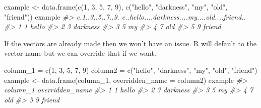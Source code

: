 \documentclass[
]{krantz}
\makeatletter
\newenvironment{Shaded}{\begin{snugshade}}{\end{snugshade}}
\newcommand{\AttributeTok}[1]{\textcolor[rgb]{0.61,0.61,0.61}{#1}}
\newcommand{\CommentTok}[1]{\textcolor[rgb]{0.37,0.37,0.37}{\textit{#1}}}
\newcommand{\DecValTok}[1]{\textcolor[rgb]{0.06,0.06,0.06}{#1}}
\newcommand{\FunctionTok}[1]{\textcolor[rgb]{0,0,0}{#1}}
\newcommand{\NormalTok}[1]{#1}
\newcommand{\OtherTok}[1]{\textcolor[rgb]{0.37,0.37,0.37}{#1}}
\newcommand{\StringTok}[1]{\textcolor[rgb]{0.5,0.5,0.5}{#1}}
\newenvironment{kframe}{%
\medskip{}
\setlength{\fboxsep}{.8em}
 \def\at@end@of@kframe{}%
 \ifinner\ifhmode%
  \def\at@end@of@kframe{\end{minipage}}%
  \begin{minipage}{\columnwidth}%
 \fi\fi%
 \def\FrameCommand##1{\hskip\@totalleftmargin \hskip-\fboxsep
 \colorbox{shadecolor}{##1}\hskip-\fboxsep
     \hskip-\linewidth \hskip-\@totalleftmargin \hskip\columnwidth}%
 \MakeFramed {\advance\hsize-\width
   \@totalleftmargin\z@ \linewidth\hsize
   \@setminipage}}%
 {\par\unskip\endMakeFramed%
 \at@end@of@kframe}
\renewenvironment{Shaded}{\begin{kframe}}{\end{kframe}}
\makeatother
\begin{document}
\begin{Shaded}
\begin{Highlighting}[]
\NormalTok{example }\OtherTok{\textless{}{-}} \FunctionTok{data.frame}\NormalTok{(}\FunctionTok{c}\NormalTok{(}\DecValTok{1}\NormalTok{, }\DecValTok{3}\NormalTok{, }\DecValTok{5}\NormalTok{, }\DecValTok{7}\NormalTok{, }\DecValTok{9}\NormalTok{),}
                      \FunctionTok{c}\NormalTok{(}\StringTok{"hello"}\NormalTok{, }\StringTok{"darkness"}\NormalTok{, }\StringTok{"my"}\NormalTok{, }\StringTok{"old"}\NormalTok{, }\StringTok{"friend"}\NormalTok{))}
\NormalTok{example}
\CommentTok{\#\textgreater{}   c.1..3..5..7..9. c..hello....darkness....my....old....friend..}
\CommentTok{\#\textgreater{} 1                1                                         hello}
\CommentTok{\#\textgreater{} 2                3                                      darkness}
\CommentTok{\#\textgreater{} 3                5                                            my}
\CommentTok{\#\textgreater{} 4                7                                           old}
\CommentTok{\#\textgreater{} 5                9                                        friend}
\end{Highlighting}
\end{Shaded}

If the vectors are already made then we won't have an issue. R will default to the vector name but we can override that if we want.

\begin{Shaded}
\begin{Highlighting}[]
\NormalTok{column\_1 }\OtherTok{=} \FunctionTok{c}\NormalTok{(}\DecValTok{1}\NormalTok{, }\DecValTok{3}\NormalTok{, }\DecValTok{5}\NormalTok{, }\DecValTok{7}\NormalTok{, }\DecValTok{9}\NormalTok{)}
\NormalTok{column2  }\OtherTok{=} \FunctionTok{c}\NormalTok{(}\StringTok{"hello"}\NormalTok{, }\StringTok{"darkness"}\NormalTok{, }\StringTok{"my"}\NormalTok{, }\StringTok{"old"}\NormalTok{, }\StringTok{"friend"}\NormalTok{)}
\NormalTok{example }\OtherTok{\textless{}{-}} \FunctionTok{data.frame}\NormalTok{(column\_1, }
           \AttributeTok{overridden\_name =}\NormalTok{ column2)}
\NormalTok{example}
\CommentTok{\#\textgreater{}   column\_1 overridden\_name}
\CommentTok{\#\textgreater{} 1        1           hello}
\CommentTok{\#\textgreater{} 2        3        darkness}
\CommentTok{\#\textgreater{} 3        5              my}
\CommentTok{\#\textgreater{} 4        7             old}
\CommentTok{\#\textgreater{} 5        9          friend}
\end{Highlighting}
\end{Shaded}
\end{document}
